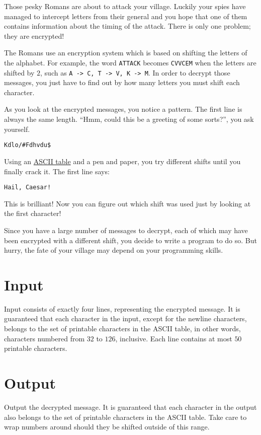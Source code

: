 
Those pesky Romans are about to attack your village.
Luckily your spies have managed to intercept letters from their general
and you hope that one of them contains information about the timing of the attack.
There is only one problem; they are encrypted!

The Romans use an encryption system which is based on shifting the letters of the alphabet.
For example, the word \texttt{ATTACK} becomes \texttt{CVVCEM} when the letters are shifted by $2$, such as \texttt{A -> C, T -> V, K -> M}.
In order to decrypt those messages, you just have to find out by how many letters you must shift each character.

As you look at the encrypted messages, you notice a pattern.
The first line is always the same length.
``Hmm, could this be a greeting of some sorts?'', you ask yourself.

\texttt{Kdlo/\#Fdhvdu\$}

Using an \href{https://en.wikipedia.org/wiki/ASCII#Printable_characters}{ASCII table} and a pen and paper,
you try different shifts until you finally crack it.
The first line says:

\texttt{Hail, Caesar!}

This is brilliant!
Now you can figure out which shift was used just by looking at the first character!

Since you have a large number of messages to decrypt,
each of which may have been encrypted with a different shift,
you decide to write a program to do so.
But hurry, the fate of your village may depend on your programming skills.

\section*{Input}
Input consists of exactly four lines, representing the encrypted message.
It is guaranteed that each character in the input, except for the newline characters,
belongs to the set of printable characters in the ASCII table,
in other words, characters numbered from $32$ to $126$, inclusive.
Each line contains at most $50$ printable characters.

\section*{Output}
Output the decrypted message.
It is guaranteed that each character in the output also belongs to the set of printable characters in the ASCII table.
Take care to wrap numbers around should they be shifted outside of this range.
